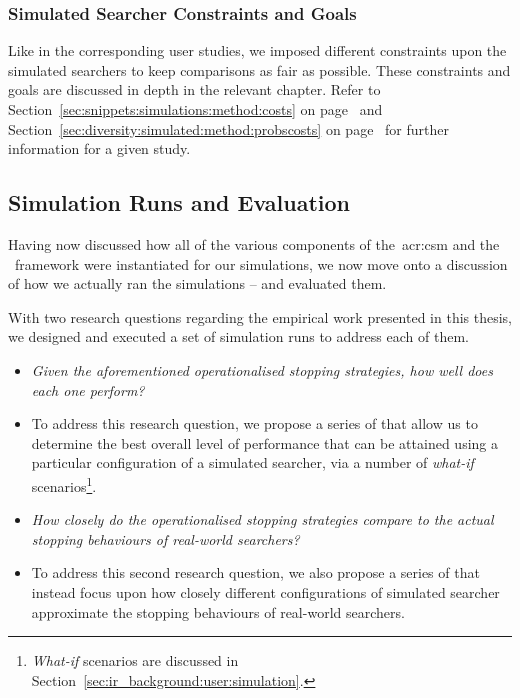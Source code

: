 \begin{table}[t!]
\begin{center}
\begin{tabulary}{\textwidth}{L{4cm}@{\CS}L{11.8cm}}
\end{tabulary}
\vspace*{-3mm}
\end{center}
\end{table}

\subsubsection{Simulated Searcher Constraints and Goals}\label{sec:method:simulation:grounding:constraints}
Like in the corresponding user studies, we imposed different constraints upon the simulated searchers to keep comparisons as fair as possible. These constraints and goals are discussed in depth in the relevant chapter. Refer to Section~\ref{sec:snippets:simulations:method:costs} on page~\pageref{sec:snippets:simulations:method:costs} and Section~\ref{sec:diversity:simulated:method:probscosts} on page~\pageref{sec:diversity:simulated:method:probscosts} for further information for a given study.

\subsection{Simulation Runs and Evaluation}\label{sec:method:simulation:runs}
Having now discussed how all of the various components of the~\gls{acr:csm} and the \simiir~framework were instantiated for our simulations, we now move onto a discussion of how we actually ran the simulations -- and evaluated them.

With two research questions regarding the empirical work presented in this thesis, we designed and executed a set of simulation runs to address each of them.

\begin{itemize}
    \item{ \emph{Given the aforementioned operationalised stopping strategies, how well does each one perform?}}
    \item[]{To address this research question, we propose a series of  that allow us to determine the best overall level of performance that can be attained using a particular configuration of a simulated searcher, via a number of \emph{what-if} scenarios\footnote{\emph{What-if} scenarios are discussed in Section~\ref{sec:ir_background:user:simulation}.}.}
    
    \item{ \emph{How closely do the operationalised stopping strategies compare to the actual stopping behaviours of real-world searchers?}}
    \item[]{To address this second research question, we also propose a series of  that instead focus upon how closely different configurations of simulated searcher approximate the stopping behaviours of real-world searchers.}
\end{itemize}

